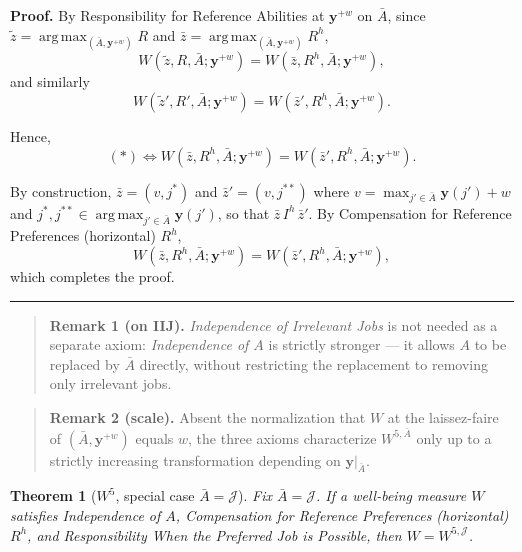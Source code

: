 \documentclass[12pt,thmsb]{article}
\DeclareMathOperator*{\argmax}{arg\,max}
\newtheorem{theorem}{Theorem}
\newenvironment{proof}[1][Proof]{\noindent \textbf{#1.} }{\  \rule{0.5em}{0.5em}}
\begin{document}
\begin{proof}
By Responsibility for Reference Abilities at $\mathbf y^{+w}$ on $\bar A$, since $\tilde z=\argmax_{(\bar A,\mathbf y^{+w})}R$ and $\bar z=\argmax_{(\bar A,\mathbf y^{+w})}R^h$,
\begin{equation*}
W(\tilde z,R,\bar A;\mathbf y^{+w})=W(\bar z,R^h,\bar A;\mathbf y^{+w}),
\end{equation*}
and similarly
\begin{equation*}
W(\tilde z',R',\bar A;\mathbf y^{+w})=W(\bar z',R^h,\bar A;\mathbf y^{+w}).
\end{equation*}

Hence,
\begin{equation*}
(*)\Leftrightarrow W(\bar z,R^h,\bar A;\mathbf y^{+w})=W(\bar z',R^h,\bar A;\mathbf y^{+w}).
\end{equation*}

By construction, $\bar z=(v,j^*)$ and $\bar z'=(v,j^{**})$ where $v=\max_{j'\in\bar A}\mathbf y(j')+w$ and $j^*,j^{**}\in\argmax_{j'\in\bar A}\mathbf y(j')$, so that $\bar z\,I^h\,\bar z'$. By Compensation for Reference Preferences (horizontal) $R^h$,
\begin{equation*}
W(\bar z,R^h,\bar A;\mathbf y^{+w})=W(\bar z',R^h,\bar A;\mathbf y^{+w}),
\end{equation*}
which completes the proof.
\end{proof}

\begin{quote}
\textbf{Remark 1 (on IIJ).} \emph{Independence of Irrelevant Jobs} is not needed as a separate axiom: \emph{Independence of $A$} is strictly stronger --- it allows $A$ to be replaced by $\bar A$ directly, without restricting the replacement to removing only irrelevant jobs.
\end{quote}

\begin{quote}
\textbf{Remark 2 (scale).} Absent the normalization that $W$ at the laissez-faire of $(\bar A,\mathbf y^{+w})$ equals $w$, the three axioms characterize $W^{5,\bar A}$ only up to a strictly increasing transformation depending on $\mathbf y|_{\bar A}$.
\end{quote}

\begin{theorem}[$W^5$, special case $\bar A=\mathcal J$]
Fix $\bar A=\mathcal J$. If a well-being measure $W$ satisfies Independence of $A$, Compensation for Reference Preferences (horizontal) $R^h$, and Responsibility When the Preferred Job is Possible, then $W=W^{5,\mathcal J}$.
\end{theorem}
\end{document}
